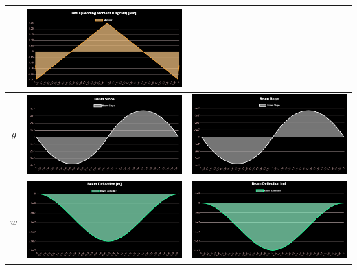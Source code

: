 \documentclass{jsarticle}
\begin{document}
\begin{table}[H]
\begin{center}
\begin{tabular}{|c|c|c|}
\begin{minipage}{6truecm}
\end{minipage}
&
\begin{minipage}{6truecm}
\centering
\includegraphics[width=6cm]{fixed_one_model_FDM_bm.PNG}
\end{minipage}
\\
\hline
$\theta$ &
\begin{minipage}{6truecm}
\centering
\includegraphics[width=6cm]{fixed_one_model_FEM_slo.PNG}
\end{minipage}
&
\begin{minipage}{6truecm}
\centering
\includegraphics[width=6cm]{fixed_one_model_FDM_slo.PNG}
\end{minipage}
\\
\hline
$w$ &
\begin{minipage}{6truecm}
\centering
\includegraphics[width=6cm]{fixed_one_model_FEM_def.PNG}
\end{minipage}
&
\begin{minipage}{6truecm}
\centering
\includegraphics[width=6cm]{fixed_one_model_FDM_def.PNG}
\end{minipage}
\\
\hline
\end{tabular}
\end{center}
\end{table}
\end{document}
